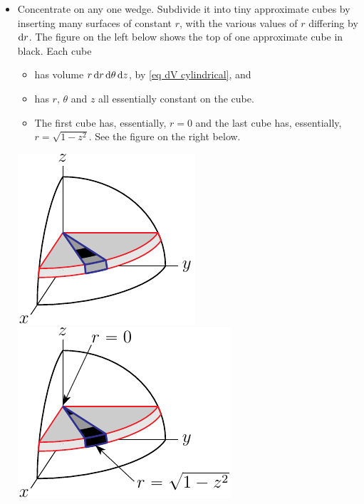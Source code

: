 \begin{eg}
\begin{itemize}
\item 
Concentrate on any one wedge. Subdivide it into tiny approximate cubes
by inserting many surfaces of constant $r$, with the various values of $r$ differing by $\mathrm{d}r$. The figure on the left below shows the top of one 
approximate cube in black. Each cube 
\vspace{-\topsep}
\begin{itemize} \itemsep1pt \parskip0pt 
\item
has volume $r\,\mathrm{d}r\,\mathrm{d}\theta\,\mathrm{d}z$, by \eqref{eq dV cylindrical},
and 
\item
has $r$, $\theta$ and $z$ all essentially constant on the cube.
\item The first cube has, essentially, $r=0$ and the last cube has,
essentially, $r=\sqrt{1-z^2}$.  See the figure on the right below.
\end{itemize}
\vspace{-\topsep}
\begin{efig}
\begin{center}
    \includegraphics{sphereCyl3a.pdf}\qquad\qquad
    \includegraphics{sphereCyl3b.pdf}
\end{center}
\end{efig}
\end{itemize}


\end{eg}
